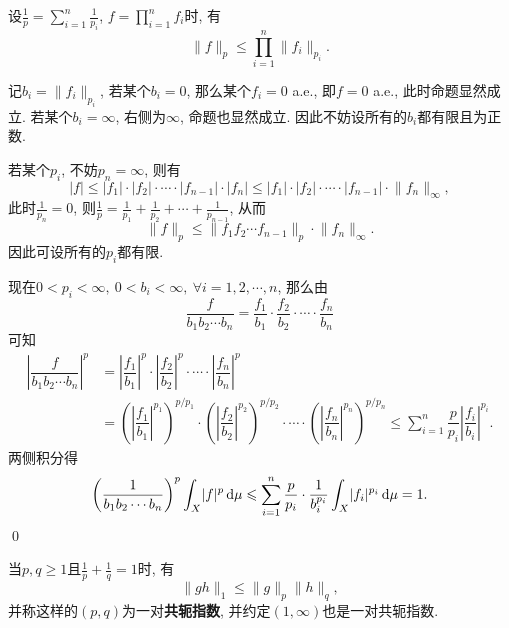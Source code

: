 	\begin{Proposition}[H\"older]
			设$ \frac{1}{p}=\sum\limits_{i=1}^n\frac{1}{p_i} $, $ f=\prod\limits_{i=1}^nf_i $时, 有
			\[
			\lVert f\rVert_p\leqslant\prod_{i=1}^n\lVert f_i\rVert_{p_i}.
			\]
	\end{Proposition}
	\begin{Proof}
			记$ b_i=\lVert f_i\rVert_{p_i} $, 若某个$ b_i=0 $, 那么某个$ f_i=0 $ a.e., 即$ f=0 $ a.e., 此时命题显然成立. 若某个$ b_i=\infty $, 右侧为$ \infty $, 命题也显然成立. 因此不妨设所有的$ b_i $都有限且为正数.
			
			若某个$ p_i $, 不妨$ p_n=\infty $, 则有
			\[
			\lvert f\rvert\leqslant\lvert f_1\rvert\cdot\lvert f_2\rvert\cdot\cdots\cdot\lvert f_{n-1}\rvert\cdot\lvert f_n\rvert\leqslant \lvert f_1\rvert\cdot\lvert f_2\rvert\cdot\cdots\cdot\lvert f_{n-1}\rvert\cdot\lVert f_n\rVert_\infty,
			\]
			此时$ \frac{1}{p_n}=0 $, 则$ \frac{1}{p}=\frac{1}{p_1}+\frac{1}{p_2}+\cdots+\frac{1}{p_{n-1}} $, 从而
			\[
			\lVert f\rVert_p\leqslant\lVert f_1f_2\cdots f_{n-1}\rVert_p\cdot\lVert f_n\rVert_\infty.
			\]
			因此可设所有的$ p_i $都有限.
			
			现在$ 0<p_i<\infty,\ 0<b_i<\infty,\ \forall i=1,2,\cdots,n $, 那么由
			\[
			\dfrac{f}{b_1b_2\cdots b_n}=\dfrac{f_1}{b_1}\cdot\dfrac{f_2}{b_2}\cdot\cdots\cdot\dfrac{f_n}{b_n}
			\]
			可知
			\begin{align*}
			\left| \dfrac{f}{b_1b_2\cdots b_n} \right|^p&=\left| \dfrac{f_1}{b_1} \right|^p\cdot\left| \dfrac{f_2}{b_2} \right|^p\cdot\cdots\cdot\left| \dfrac{f_n}{b_n} \right|^p\\
			&=\left(\left| \dfrac{f_1}{b_1} \right|^{p_1}\right)^{p/p_1}\cdot\left(\left| \dfrac{f_2}{b_2} \right|^{p_2}\right)^{p/p_2}\cdot\cdots\cdot\left(\left| \dfrac{f_n}{b_n} \right|^{p_n}\right)^{p/p_n}\leqslant\sum_{i=1}^n\dfrac{p}{p_i}\left| \dfrac{f_i}{b_i} \right|^{p_i}.
			\end{align*}
		两侧积分得
			\[
			\left(\dfrac{1}{b_1b_2\cdots b_n}\right)^p\int_X\lvert f\rvert^p\,\mathrm{d}\mu\leqslant\sum_{i=1}^n\dfrac{p}{p_i}\cdot\dfrac{1}{b_i^{p_i}}\int_X\lvert f_i\rvert^{p_i}\,\mathrm{d}\mu=1.
			\]\qed
	\end{Proof}
		
	\begin{Corollary}[H\"older]
			当$ p,q\geqslant 1 $且$ \frac{1}{p}+\frac{1}{q}=1 $时, 有
			\[
			\lVert gh\rVert_1\leqslant\lVert g\rVert_p\lVert h\rVert_q,
			\]
			并称这样的$ (p,q) $为一对\textbf{共轭指数}, 并约定$ (1,\infty) $也是一对共轭指数.
	\end{Corollary}
	
